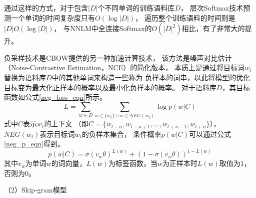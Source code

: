 \documentclass{standalone}
\begin{document}
通过这样的方式，对于包含$|D|$个不同单词的训练语料库$D$，
层次Softmax技术预测一个单词的时间复杂度只有$O\left ( \log|D| \right )$，
遍历整个训练语料的时间则是$|D|O\left ( \log|D| \right )$，
与NNLM中全连接Softmax的$O\left ( |D|^2 \right )$相比，有了非常大的提升。

负采样技术是CBOW提供的另一种加速计算技术，
该方法是噪声对比估计（Noise-Contrastive Estimation，NCE）的简化版本，
本质上是通过将目标词$w_t$替换为语料库$D$中的其他单词来构造一些称为
负样本的词串，以此将模型的优化目标变为最大化正样本的概率以及最小化负样本的概率。
对于语料库$D$，其目标函数如公式\ref{neg_loss_eqn}所示。
\begin{equation}
    L = \sum_{w\in D} \sum_{w\in \{w_t\} \cup w\in NEG\left ( w_t \right )} \log p\left ( w|C \right )
    \label{neg_loss_eqn}
\end{equation}
式中$C$表示$w_t$的上下文
（即$C=\{w_{t-n},w_{t-n+1},...,w_{t+n-1},w_{t+n}\}$），
$NEG(w_t)$表示目标词$w_t$的负样本集合，
条件概率$p\left ( w|C \right )$可以通过公式\ref{neg_p_eqn}得到。
\begin{equation}
    p\left ( w|C \right )=\sigma\left ( v_w\theta  \right )^{L(w)}+\left ( 1- \sigma\left ( v_w\theta  \right )\right )^{1-L\left ( w \right )}
    \label{neg_p_eqn}
\end{equation}
其中$v_w$为单词$w$的词向量，$L(w)$为标签函数，当$w$为正样本时$L(w)$取值为$1$，否则为$0$。

（2）Skip-gram模型
\end{document}
